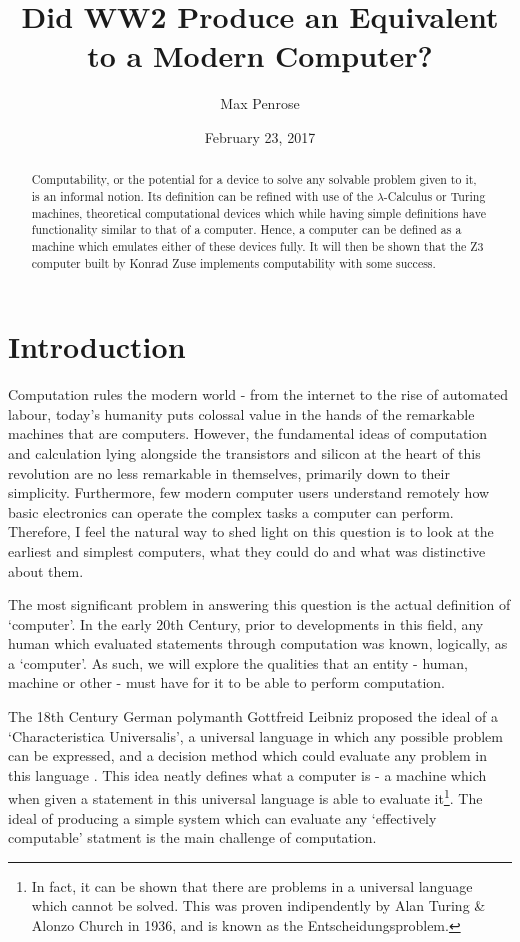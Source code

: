 \documentclass {article}
\title{Did WW2 Produce an Equivalent to a Modern Computer?}
\date{February 23, 2017}
\author{Max Penrose}
\begin{document}
\maketitle
\medskip

\begin{abstract}
Computability, or the potential for a device to solve any solvable problem given to it, is an informal notion. Its definition can be refined with use of the $\lambda$-Calculus or Turing machines, theoretical computational devices which while having simple definitions have functionality similar to that of a computer. Hence, a computer can be defined as a machine which emulates either of these devices fully. It will then be shown that the Z3 computer built by Konrad Zuse implements computability with some success.
\end{abstract}

\section*{Introduction}
Computation rules the modern world - from the internet to the rise of automated labour, today's humanity puts colossal value in the hands of the remarkable machines that are computers. However, the fundamental ideas of computation and calculation lying alongside the transistors and silicon at the heart of this revolution are no less remarkable in themselves, primarily down to their simplicity. Furthermore, few modern computer users understand remotely how basic electronics can operate the complex tasks a computer can perform. Therefore, I feel the natural way to shed light on this question is to look at the earliest and simplest computers, what they could do and what was distinctive about them.

The most significant problem in answering this question is the actual definition of `computer'. In the early 20th Century, prior to developments in this field, any human which evaluated statements through computation was known, logically, as a `computer'. As such, we will explore the qualities that an entity - human, machine or other - must have for it to be able to perform computation.

The 18th Century German polymanth Gottfreid Leibniz proposed the ideal of a `Characteristica Universalis', a universal language in which any possible problem can be expressed, and a decision method which could evaluate any problem in this language \cite{barendregt1984introduction}. This idea neatly defines what a computer is - a machine which when given a statement in this universal language is able to evaluate it\footnote{In fact, it can be shown that there are problems in a universal language which cannot be solved. This was proven indipendently by Alan Turing \cite{turing1936computablenumbers} \& Alonzo Church in 1936, and is known as the Entscheidungsproblem.}. The ideal of producing a simple system which can evaluate any `effectively computable' statment is the main challenge of computation.
\end{document}
